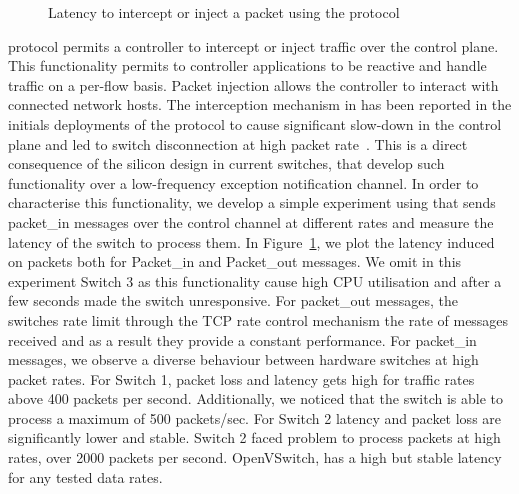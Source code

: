\begin{figure}[ht]
  \begin{center}
  \end{center}
  \caption{Latency to intercept or inject a packet using the \of protocol}
  \label{fig:pkt_in_out_delay}
\end{figure}

\of protocol permits a controller to intercept or inject traffic over the
control plane. This functionality permits to \of controller applications to be reactive and
handle traffic on a per-flow basis. Packet injection allows the controller to
interact with connected network hosts. The interception mechanism in \of has
been reported in the initials deployments of the protocol to cause significant
slow-down in the control plane and led to switch disconnection at high packet
rate~\cite{Kobayashi:vn}. This is a direct consequence of the silicon design in
current \of switches, that develop such functionality over a low-frequency
exception notification channel. In order to characterise this functionality, we
develop a simple experiment using \oflops that sends packet\_in messages over the
control channel at different rates
and measure the latency of the switch to process them. In
Figure~\ref{fig:pkt_in_out_delay}, we plot the latency induced on packets both
for Packet\_in and Packet\_out messages. We omit in this experiment Switch 3 as
this functionality cause high CPU utilisation and after a few seconds made the
switch unresponsive. For packet\_out messages, the switches rate limit through
the TCP rate control mechanism the rate of messages received and as a result they
provide a constant performance. For packet\_in messages, we observe a diverse
behaviour between hardware switches at high packet rates. For Switch 1, packet
loss and latency gets high for traffic rates above 400 packets per second.
Additionally, we noticed that the switch is able to process a maximum of 500
packets/sec. For Switch 2 latency and packet loss are significantly lower and
stable. Switch 2 faced problem to process packets at high rates, over 2000
packets per second. OpenVSwitch, has a high but stable latency for any tested
data rates. 

